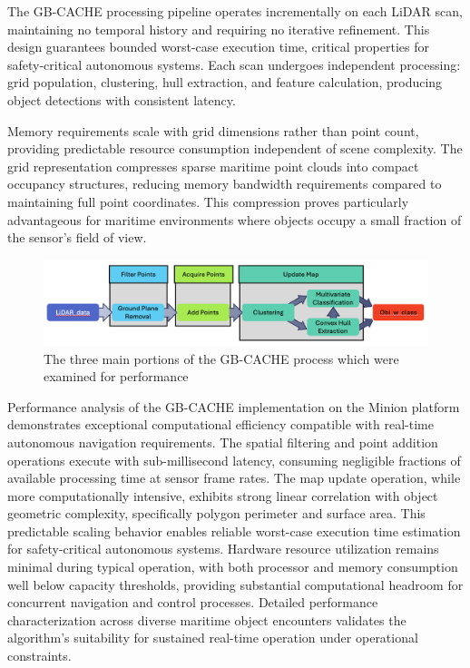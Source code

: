 \documentclass[../main.tex]{subfiles}
\begin{document}
The GB-CACHE processing pipeline operates incrementally on each \ac{LiDAR} scan, maintaining no temporal history and requiring no iterative refinement.
This design guarantees bounded worst-case execution time, critical properties for safety-critical autonomous systems.
Each scan undergoes independent processing: grid population, clustering, hull extraction, and feature calculation, producing object detections with consistent latency.

Memory requirements scale with grid dimensions rather than point count, providing predictable resource consumption independent of scene complexity.
The grid representation compresses sparse maritime point clouds into compact occupancy structures, reducing memory bandwidth requirements compared to maintaining full point coordinates.
This compression proves particularly advantageous for maritime environments where objects occupy a small fraction of the sensor's field of view.

\begin{figure}
    \centering
    \includegraphics[width=0.95\linewidth]{Images/gbcache_flow.png}
    \caption{The three main portions of the GB-CACHE process which were examined for performance}
    \label{fig:gbcache_flow_analysis}
\end{figure}

Performance analysis of the \ac{GB-CACHE} implementation on the Minion platform demonstrates exceptional computational efficiency compatible with real-time autonomous navigation requirements.
The spatial filtering and point addition operations execute with sub-millisecond latency, consuming negligible fractions of available processing time at sensor frame rates.
The map update operation, while more computationally intensive, exhibits strong linear correlation with object geometric complexity, specifically polygon perimeter and surface area.
This predictable scaling behavior enables reliable worst-case execution time estimation for safety-critical autonomous systems.
Hardware resource utilization remains minimal during typical operation, with both processor and memory consumption well below capacity thresholds, providing substantial computational headroom for concurrent navigation and control processes.
Detailed performance characterization across diverse maritime object encounters validates the algorithm's suitability for sustained real-time operation under operational constraints.
\end{document}
